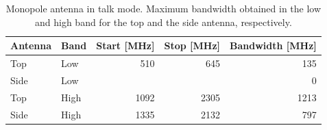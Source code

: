 \begin{table}[htbp]
    \centering
    \begin{tabular}{|l|l|r|r|r|}
        \hline
        Antenna & Band & Start [MHz] & Stop [MHz] & Bandwidth [MHz] \\
        \hline
        Top     & Low  & 510 & 645  & 135 \\
        Side    & Low  & & & 0    \\
        \hline
        Top     & High & 1092 & 2305  & 1213 \\
        Side    & High & 1335  & 2132 & 797 \\
        \hline
    \end{tabular}
    \caption{Monopole antenna in talk mode. Maximum bandwidth obtained in the low and high band for the top and the side antenna, respectively.}
    \label{tab:bw_sol1talk}
\end{table}

